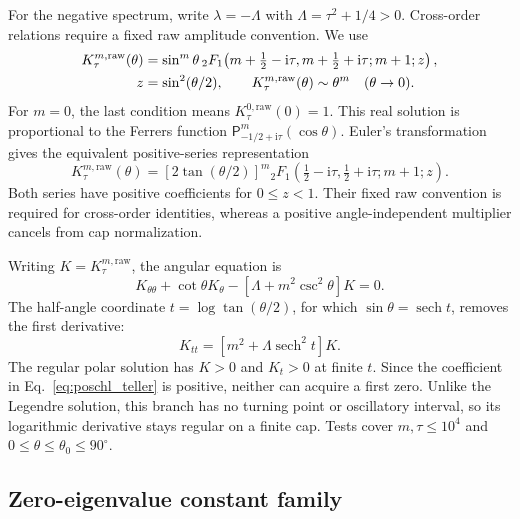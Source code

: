﻿\documentclass[11pt,a4paper]{article}
\newcommand{\ii}{\mathrm{i}}
\newcommand{\sech}{\operatorname{sech}}
\begin{document}
For the negative spectrum, write $\lambda=-\Lambda$ with $\Lambda=\tau^2+1/4>0$. Cross-order relations require a fixed raw amplitude convention. We use
\begin{align}
 K_{\tau}^{m,\mathrm{raw}}(\theta)
 &=\sin^m\theta\,
 {}_2F_1\!\left(m+\tfrac12-\ii\tau,m+\tfrac12+\ii\tau;
 m+1;z\right),\notag\\
 z&=\sin^2(\theta/2),
 \qquad K_{\tau}^{m,\mathrm{raw}}(\theta)\sim\theta^m
 \quad(\theta\to0).
 \label{eq:mehler_raw_convention}
\end{align}
For $m=0$, the last condition means $K_{\tau}^{0,\mathrm{raw}}(0)=1$. This real solution is proportional to the Ferrers function $\mathsf P_{-1/2+\ii\tau}^{m}(\cos\theta)$. Euler's transformation gives the equivalent positive-series representation
\begin{equation}
 K_{\tau}^{m,\mathrm{raw}}(\theta)
 =\left[2\tan(\theta/2)\right]^m
 {}_2F_1\!\left(\tfrac12-\ii\tau,\tfrac12+\ii\tau;m+1;z\right).
 \label{eq:mehler_raw_positive}
\end{equation}
Both series have positive coefficients for $0\leq z<1$. Their fixed raw convention is required for cross-order identities, whereas a positive angle-independent multiplier cancels from cap normalization.

Writing $K=K_{\tau}^{m,\mathrm{raw}}$, the angular equation is
\begin{equation}
 K_{\theta\theta}+\cot\theta K_\theta
 -\left[\Lambda+m^2\csc^2\theta\right]K=0.
 \label{eq:mehler_ode}
\end{equation}
The half-angle coordinate $t=\log\tan(\theta/2)$, for which $\sin\theta=\sech t$, removes the first derivative:
\begin{equation}
 K_{tt}=\left[m^2+\Lambda\sech^2t\right]K.
 \label{eq:poschl_teller}
\end{equation}
The regular polar solution has $K>0$ and $K_t>0$ at finite $t$. Since the coefficient in Eq.~\eqref{eq:poschl_teller} is positive, neither can acquire a first zero. Unlike the Legendre solution, this branch has no turning point or oscillatory interval, so its logarithmic derivative stays regular on a finite cap. Tests cover $m,\tau\leq10^4$ and $0\leq\theta\leq\theta_0\leq90^\circ$.

\subsection{Zero-eigenvalue constant family}
\end{document}
